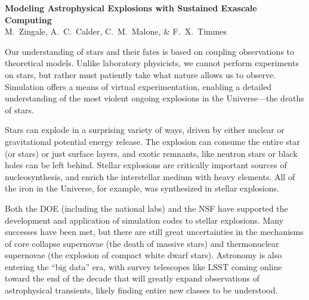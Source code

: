 \documentclass[11pt,twocolumn]{article}
\begin{document}
\thispagestyle{plain}

\begin{center}
{\sffamily \bfseries Modeling Astrophysical Explosions with Sustained 
                     Exascale Computing\footnotemark[1]} \\
{\small
M.~Zingale\footnotemark[2]\footnotemark[5], 
A.~C.~Calder\footnotemark[2], 
C.~M.~Malone\footnotemark[3],
\& F.~X.~Timmes\footnotemark[4]
}
\end{center}
%

Our understanding of stars and their fates is based on coupling
observations to theoretical models.  Unlike laboratory physicists, we
cannot perform experiments on stars, but rather must
patiently take what nature allows us to observe.  Simulation offers a means
of virtual experimentation, enabling a detailed understanding of the
most violent ongoing explosions in the Universe---the deaths of stars.

Stars can explode in a surprising variety of ways, driven by either
nuclear or gravitational potential energy release.  The
explosion can consume the entire star (or stars) or just
surface layers, and exotic remnants, like neutron stars or black holes
can be left behind.  Stellar explosions are critically important sources of
nucleosynthesis, and enrich the interstellar medium with heavy elements.
All of the iron in the Universe, for example, was synthesized in
stellar explosions.

Both the DOE (including the national labs) and the
NSF have supported the development and application of simulation codes
to stellar explosions.  Many successes have been met, but there are
still great uncertainties in the mechanisms of core collapse
supernovae (the death of massive stars) and thermonuclear supernovae
(the explosion of compact white dwarf stars).  Astronomy is also
entering the ``big data'' era, with survey telescopes
like LSST coming online toward the end of the decade that will greatly
expand observations of astrophysical transients, likely finding entire
new classes to be understood.
\end{document}
